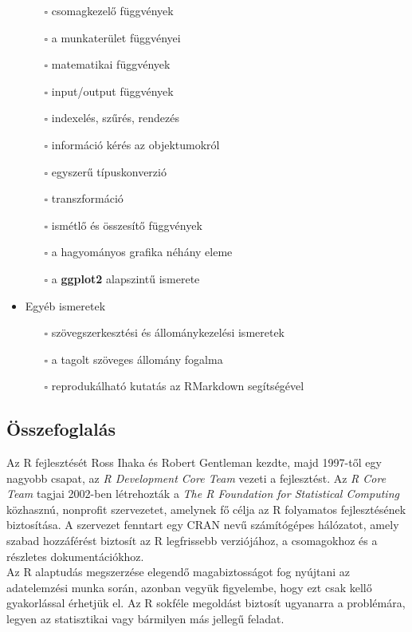 \documentclass[
]{book}
\makeatletter
\providecommand{\tightlist}{%
  \setlength{\itemsep}{0pt}\setlength{\parskip}{0pt}}
\newenvironment{kframe}{%
\medskip{}
\setlength{\fboxsep}{.8em}
 \def\at@end@of@kframe{}%
 \ifinner\ifhmode%
  \def\at@end@of@kframe{\end{minipage}}%
  \begin{minipage}{\columnwidth}%
 \fi\fi%
 \def\FrameCommand##1{\hskip\@totalleftmargin \hskip-\fboxsep
 \colorbox{shadecolor}{##1}\hskip-\fboxsep
     \hskip-\linewidth \hskip-\@totalleftmargin \hskip\columnwidth}%
 \MakeFramed {\advance\hsize-\width
   \@totalleftmargin\z@ \linewidth\hsize
   \@setminipage}}%
 {\par\unskip\endMakeFramed%
 \at@end@of@kframe}
\newenvironment{rmdblock}[1]
  {
  \begin{itemize}
  \renewcommand{\labelitemi}{
    \raisebox{-.7\height}[0pt][0pt]{
      {\setkeys{Gin}{width=3em,keepaspectratio}\texttt{[image: images/\#1]}}
    }
  }
  \setlength{\fboxsep}{1em}
  \begin{kframe}
  \item
  }
  {
  \end{kframe}
  \end{itemize}
  }
\newenvironment{rmdsummary}
  {\begin{rmdblock}{summary}}
  {\end{rmdblock}}
\makeatother
\begin{document}
\begin{itemize}
  \begin{itemize}
  \tightlist
  \item[$\square$]
    csomagkezelő függvények
  \item[$\square$]
    a munkaterület függvényei
  \item[$\square$]
    matematikai függvények
  \item[$\square$]
    input/output függvények
  \item[$\square$]
    indexelés, szűrés, rendezés
  \item[$\square$]
    információ kérés az objektumokról
  \item[$\square$]
    egyszerű típuskonverzió
  \item[$\square$]
    transzformáció
  \item[$\square$]
    ismétlő és összesítő függvények
  \item[$\square$]
    a hagyományos grafika néhány eleme
  \item[$\square$]
    a \textbf{ggplot2} alapszintű ismerete
  \end{itemize}
\item
  Egyéb ismeretek

  \begin{itemize}
  \tightlist
  \item[$\square$]
    szövegszerkesztési és állománykezelési ismeretek
  \item[$\square$]
    a tagolt szöveges állomány fogalma
  \item[$\square$]
    reprodukálható kutatás az RMarkdown segítségével
  \end{itemize}
\end{itemize}

\hypertarget{mi-az-r-3-summary}{%
\subsection{Összefoglalás}\label{mi-az-r-3-summary}}

\begin{rmdsummary}
Az R fejlesztését Ross Ihaka és Robert Gentleman kezdte, majd 1997-től
egy nagyobb csapat, az \emph{R Development Core Team} vezeti a
fejlesztést. Az \emph{R Core Team} tagjai 2002-ben létrehozták a
\emph{The R Foundation for Statistical Computing} közhasznú, nonprofit
szervezetet, amelynek fő célja az R folyamatos fejlesztésének
biztosítása. A szervezet fenntart egy CRAN nevű számítógépes hálózatot,
amely szabad hozzáférést biztosít az R legfrissebb verziójához, a
csomagokhoz és a részletes dokumentációkhoz.\\
Az R alaptudás megszerzése elegendő magabiztosságot fog nyújtani az
adatelemzési munka során, azonban vegyük figyelembe, hogy ezt csak kellő
gyakorlással érhetjük el. Az R sokféle megoldást biztosít ugyanarra a
problémára, legyen az statisztikai vagy bármilyen más jellegű feladat.
\end{rmdsummary}
\end{document}
